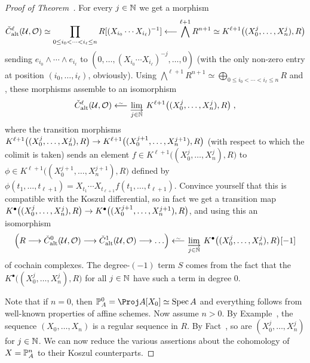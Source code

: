 \documentclass[a4paper,parskip=half,numbers=enddot, DIV=12]{scrreprt}
\begin{document}
\begin{proof}[Proof of Theorem~]
	For every $j\in\mathbb{N}$ we get a morphism
	\begin{align*}
		\check{C}_\alt^\ell(\Uu,\Oo)\simeq \prod_{0\leq i_0<\cdots<i_\ell\leq n}R[(X_{i_0}\cdots X_{i_\ell})^{-1}]\lmorphism \bigwedge^{\ell+1}R^{n+1}\simeq K^{\ell+1}\big((X_0^j,\ldots,X_n^j),R\big)
	\end{align*}
	sending $e_{i_0}\wedge \cdots \wedge e_{i_\ell}$ to $(0,\ldots,(X_{i_0}\cdots X_{i_\ell})^{-j},\ldots,0)$ (with the only non-zero entry at position $(i_0,\ldots,i_\ell)$, obviously). Using $\bigwedge^{\ell+1}R^{n+1}\simeq \bigoplus _{0\leq i_0<\cdots <i_\ell\leq n}R$ and , these morphisms assemble to an isomorphism
	\begin{align*}
		\check{C}_\alt^\ell(\Uu,\Oo)\lisomorphism \colimit[j\in \IN] K^{\ell+1}\big((X_0^j,\ldots,X_n^j),R\big)\;,
	\end{align*}
	where the transition morphisms $K^{\ell+1}\big((X_0^j,\ldots,X_n^j),R\big)\morphism K^{\ell+1}\big((X_0^{j+1},\ldots,X_n^{j+1}),R\big)$ (with respect to which the colimit is taken) sends an element $f\in K^{\ell+1}\big((X_0^j,\ldots,X_n^j),R\big)$ to $\phi\in K^{\ell+1}\big((X_0^{j+1},\ldots,X_n^{j+1}),R\big)$ defined by $\phi(t_1,\ldots,t_{\ell+1})=X_{t_1}\cdots X_{t_{\ell+1}}f(t_1,\ldots,t_{\ell+1})$. Convince yourself that this is compatible with the Koszul differential, so in fact we get a transition map $K^\bullet\big((X_0^j,\ldots,X_n^j),R\big)\morphism K^\bullet\big((X_0^{j+1},\ldots,X_n^{j+1}),R\big)$, and using this an isomorphism
	\begin{align}\lbl{eq:CechKoszulIso2}
		\left(R\morphism\check{C}_\alt^0(\Uu,\Oo)\morphism\check{C}_\alt^1(\Uu,\Oo)\morphism\ldots\right)\lisomorphism \colimit[j\in\IN]K^\bullet\big((X_0^j,\ldots,X_n^j),R\big)[-1]
	\end{align}
	of cochain complexes. The degree-$(-1)$ term $S$ comes from the fact that the $K^\bullet\big((X_0^j,\ldots,X_n^j),R\big)$ for all $j\in\mathbb{N}$ have such a term in degree $0$.
	
	Note that if $n=0$, then $\IP_A^0=\Proj A[X_0]\simeq \Spec A$ and everything follows from well-known properties of affine schemes. Now assume $n>0$. By Example~, the sequence $(X_0,\ldots,X_n)$ is a regular sequence in $R$. By Fact~, so are $(X_0^j,\ldots,X_n^j)$ for $j\in\mathbb{N}$. We can now reduce the various assertions about the cohomology of $X=\mathbb{P}_A^n$ to their Koszul counterparts.
	

\end{proof}
\end{document}
